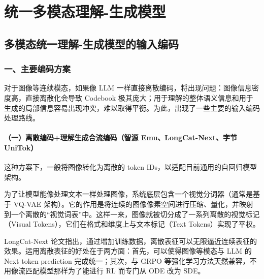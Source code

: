 \hypertarget{ux7edfux4e00ux591aux6a21ux6001ux7406ux89e3-ux751fux6210ux6a21ux578b}{%
\chapter{统一多模态理解-生成模型}\label{ux7edfux4e00ux591aux6a21ux6001ux7406ux89e3-ux751fux6210ux6a21ux578b}}

\hypertarget{ux591aux6a21ux6001ux7edfux4e00ux7406ux89e3-ux751fux6210ux6a21ux578bux7684ux8f93ux5165ux7f16ux7801}{%
\section{多模态统一理解-生成模型的输入编码}\label{ux591aux6a21ux6001ux7edfux4e00ux7406ux89e3-ux751fux6210ux6a21ux578bux7684ux8f93ux5165ux7f16ux7801}}

\hypertarget{ux4e00ux4e3bux8981ux7f16ux7801ux65b9ux6848}{%
\subsection{一、主要编码方案}\label{ux4e00ux4e3bux8981ux7f16ux7801ux65b9ux6848}}

对于图像等连续模态，如果像 LLM 一样直接离散编码，将出现问题：图像信息密度高，直接离散化会导致 Codebook 极其庞大；用于理解的整体语义信息和用于生成的局部信息容易出现冲突，难以取得平衡。为此，出现了一些主要的输入编码处理路线。

\hypertarget{ux4e00ux79bbux6563ux7f16ux7801ux7406ux89e3ux751fux6210ux5408ux6d41ux7f16ux7801ux667aux6e90-emulongcat-nextux5b57ux8282-unitok}{%
\subsubsection{（一）离散编码+理解生成合流编码（智源 Emu、LongCat-Next、字节 UniTok）}\label{ux4e00ux79bbux6563ux7f16ux7801ux7406ux89e3ux751fux6210ux5408ux6d41ux7f16ux7801ux667aux6e90-emulongcat-nextux5b57ux8282-unitok}}

这种方案下，一般将图像转化为离散的 token IDs，以适配目前通用的自回归模型架构。

为了让模型能像处理文本一样处理图像，系统底层包含一个视觉分词器（通常是基于 VQ-VAE 架构）。它的作用是将连续的图像像素空间进行压缩、量化，并映射到一个离散的``视觉词表''中。这样一来，图像就被切分成了一系列离散的视觉标记（Visual Tokens），它们在格式和维度上与文本标记（Text Tokens）实现了平权。

LongCat-Next 论文指出，通过增加训练数据，离散表征可以无限逼近连续表征的效果。运用离散表征的好处在于两方面：首先，可以使得图像等模态与 LLM 的 Next token prediction 完成统一；其次，与 GRPO 等强化学习方法天然兼容，不用像流匹配模型那样为了能进行 RL 而专门从 ODE 改为 SDE。

